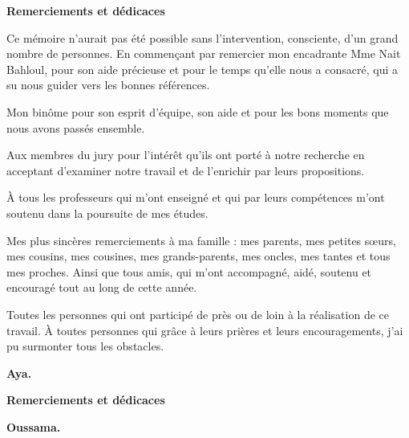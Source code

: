 \newenvironment{acknowledgement}{
  \vspace*{\fill}
  \begin{center}%
    \bfseries Remerciements et dédicaces
  \end{center}}%
  {\vfill}
  
  \thispagestyle{empty}
  
\begin{acknowledgement}

Ce mémoire n'aurait pas été possible sans l'intervention, consciente, d'un grand nombre de personnes.
En commençant par remercier mon encadrante Mme Nait Bahloul, pour son aide précieuse et pour le temps qu'elle nous a consacré, qui a su nous guider vers les bonnes références.

Mon binôme pour son esprit d'équipe, son aide et pour les bons moments que nous avons passés ensemble.

Aux membres du jury pour l'intérêt qu'ils ont porté à notre recherche en acceptant d'examiner notre travail et de l'enrichir par leurs propositions.

À tous les professeurs qui m'ont enseigné et qui par leurs compétences m'ont soutenu dans la poursuite de mes études.

Mes plus sincères remerciements à ma famille : mes parents, mes petites sœurs, mes cousins, mes cousines, mes grands-parents, mes oncles, mes tantes et tous mes proches. Ainsi que tous amis, qui m'ont accompagné, aidé, soutenu et encouragé tout au long de cette année.

Toutes les personnes qui ont participé de près ou de loin à la réalisation de ce travail. À toutes personnes qui grâce à leurs prières et leurs encouragements, j'ai pu surmonter tous les obstacles.
\begin{flushright}
\textbf{Aya.}
\end{flushright}
\end{acknowledgement}

\begin{acknowledgement}

%



\begin{flushright}
\textbf{Oussama.}
\end{flushright}
\end{acknowledgement}

\clearpage